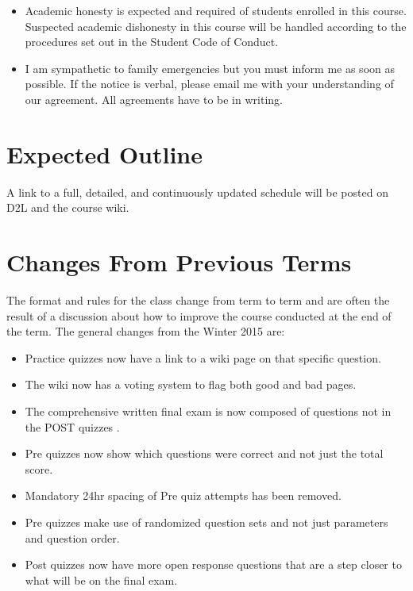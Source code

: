 \documentclass[letterpaper,10pt]{article}
\begin{document}
\begin{itemize}
\item Academic honesty is expected and required of students enrolled
  in this course.  Suspected academic dishonesty in this course will
  be handled according to the procedures set out in the Student Code
  of Conduct.

\item I am sympathetic to family emergencies but you must inform me as
  soon as possible. If the notice is verbal, please email me with your
  understanding of our agreement. All agreements have to be in
  writing.


\end{itemize}


\section{Expected Outline}
A link to a full, detailed, and continuously updated schedule will be
posted on D2L and the course wiki.


\section{Changes From Previous Terms}
The format and rules for the class change from term to term and are often the result of a discussion about how to improve the course conducted at the end of the term. The general changes from the Winter 2015 are:

\begin{itemize}
    \item Practice quizzes now have a link to a wiki page on that specific question.
    \item The wiki now has a voting system to flag both good and bad pages.
    \item The comprehensive written final exam is now composed of questions not in the POST quizzes .
    \item Pre quizzes now show which questions were correct and not just the total score.
    \item Mandatory 24hr spacing of Pre quiz attempts has been removed.
    \item Pre quizzes make use of randomized question sets and not just parameters and question order.
    \item Post quizzes now have more open response questions that are a step closer to what will be on the final exam.
\end{itemize}
\end{document}
